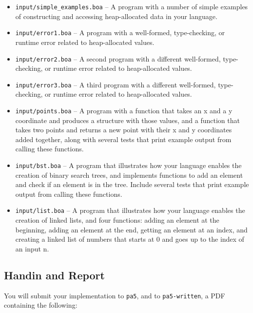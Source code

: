 \documentclass[10pt, oneside]{article}
\begin{document}
\begin{itemize}

\item {\tt input/simple\_examples.boa} -- A program with a number of simple
examples of constructing and accessing heap-allocated data in your language.

\item {\tt input/error1.boa} -- A program with a well-formed, type-checking,
or runtime error related to heap-allocated values.

\item {\tt input/error2.boa} -- A second program with a different
well-formed, type-checking, or runtime error related to heap-allocated
values.

\item {\tt input/error3.boa} -- A third program with a different well-formed,
type-checking, or runtime error related to heap-allocated values.

\item {\tt input/points.boa} -- A program with a function that takes an x and
a y coordinate and produces a structure with those values, and a function
that takes two points and returns a new point with their x and y coordinates
added together, along with several tests that print example output from
calling these functions.

\item {\tt input/bst.boa} -- A program that illustrates how your language
enables the creation of binary search trees, and implements functions to add
an element and check if an element is in the tree. Include several tests that
print example output from calling these functions.

\item {\tt input/list.boa} -- A program that illustrates how your language
enables the creation of linked lists, and four functions: adding an element
at the beginning, adding an element at the end, getting an element at an
index, and creating a linked list of numbers that starts at 0 and goes up to
the index of an input n.

\end{itemize}

\subsection*{Handin and Report}

You will submit your implementation to {\tt pa5}, and to {\tt pa5-written}, a
PDF containing the following:
\end{document}
